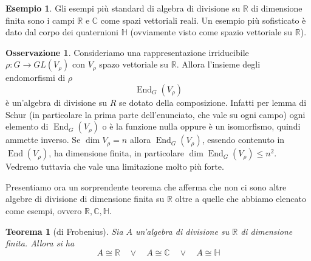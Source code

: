 \documentclass[11pt]{article}
\theoremstyle{plain}
\newtheorem{thm}{Teorema}[section]
\theoremstyle{definition}
\newtheorem{exmp}{Esempio}[section]
\newtheorem*{rem}{Osservazione}
\theoremstyle{remark}
\newcommand{\C}{\mathbb{C}}
\newcommand{\R}{\mathbb{R}}
\newcommand{\HH}{\mathbb{H}}
\DeclareMathOperator{\End}{End}
\begin{document}
\begin{exmp}
Gli esempi più standard di algebra di divisione su $\R$ di dimensione finita sono i campi $\R$ e $\C$ come spazi vettoriali reali.
Un esempio più sofisticato è dato dal corpo dei quaternioni $\HH$ (ovviamente visto come spazio vettoriale su $\R$).
\end{exmp}


\begin{rem}
Consideriamo una rappresentazione irriducibile $\rho:G\to GL(V_\rho)$ con $V_\rho$ spazo vettoriale su $\R$. Allora l'insieme degli endomorfismi
di $\rho$ 
\[ \End_G(V_\rho)\]
è un'algebra di divisione su $R$ se dotato della composizione.
Infatti per lemma di Schur (in particolare la prima parte dell'enunciato, che vale su ogni campo) ogni elemento di $\End_G(V_\rho)$ o è la funzione nulla oppure è un isomorfismo, quindi ammette inverso.
Se $\dim V_\rho = n$ allora $\End_G(V_\rho)$, essendo contenuto in $\End(V_\rho)$, ha dimensione finita, in particolare $\dim \End_G(V_\rho)\le n^2$.
Vedremo tuttavia che vale una limitazione molto più forte.
\end{rem}


Presentiamo ora un sorprendente teorema che afferma che non ci sono altre algebre di divisione di dimensione finita su $\R$ oltre a quelle che abbiamo elencato come esempi, ovvero $\R, \C, \HH$.
\begin{thm}[di Frobenius]
\label{thm: frobenius}
Sia $A$ un'algebra di divisione su $\R$ di dimensione finita. Allora si ha 
\[A \cong \R \quad \vee \quad  A \cong \C \quad \vee \quad A  \cong \HH \]
\end{thm}
\end{document}
